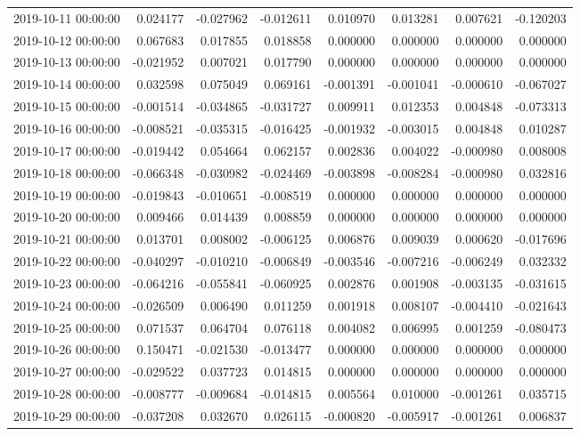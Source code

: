 \begin{tabular}{lrrrrrrr}
2019-10-11 00:00:00 & 0.024177 & -0.027962 & -0.012611 & 0.010970 & 0.013281 & 0.007621 & -0.120203 \\
2019-10-12 00:00:00 & 0.067683 & 0.017855 & 0.018858 & 0.000000 & 0.000000 & 0.000000 & 0.000000 \\
2019-10-13 00:00:00 & -0.021952 & 0.007021 & 0.017790 & 0.000000 & 0.000000 & 0.000000 & 0.000000 \\
2019-10-14 00:00:00 & 0.032598 & 0.075049 & 0.069161 & -0.001391 & -0.001041 & -0.000610 & -0.067027 \\
2019-10-15 00:00:00 & -0.001514 & -0.034865 & -0.031727 & 0.009911 & 0.012353 & 0.004848 & -0.073313 \\
2019-10-16 00:00:00 & -0.008521 & -0.035315 & -0.016425 & -0.001932 & -0.003015 & 0.004848 & 0.010287 \\
2019-10-17 00:00:00 & -0.019442 & 0.054664 & 0.062157 & 0.002836 & 0.004022 & -0.000980 & 0.008008 \\
2019-10-18 00:00:00 & -0.066348 & -0.030982 & -0.024469 & -0.003898 & -0.008284 & -0.000980 & 0.032816 \\
2019-10-19 00:00:00 & -0.019843 & -0.010651 & -0.008519 & 0.000000 & 0.000000 & 0.000000 & 0.000000 \\
2019-10-20 00:00:00 & 0.009466 & 0.014439 & 0.008859 & 0.000000 & 0.000000 & 0.000000 & 0.000000 \\
2019-10-21 00:00:00 & 0.013701 & 0.008002 & -0.006125 & 0.006876 & 0.009039 & 0.000620 & -0.017696 \\
2019-10-22 00:00:00 & -0.040297 & -0.010210 & -0.006849 & -0.003546 & -0.007216 & -0.006249 & 0.032332 \\
2019-10-23 00:00:00 & -0.064216 & -0.055841 & -0.060925 & 0.002876 & 0.001908 & -0.003135 & -0.031615 \\
2019-10-24 00:00:00 & -0.026509 & 0.006490 & 0.011259 & 0.001918 & 0.008107 & -0.004410 & -0.021643 \\
2019-10-25 00:00:00 & 0.071537 & 0.064704 & 0.076118 & 0.004082 & 0.006995 & 0.001259 & -0.080473 \\
2019-10-26 00:00:00 & 0.150471 & -0.021530 & -0.013477 & 0.000000 & 0.000000 & 0.000000 & 0.000000 \\
2019-10-27 00:00:00 & -0.029522 & 0.037723 & 0.014815 & 0.000000 & 0.000000 & 0.000000 & 0.000000 \\
2019-10-28 00:00:00 & -0.008777 & -0.009684 & -0.014815 & 0.005564 & 0.010000 & -0.001261 & 0.035715 \\
2019-10-29 00:00:00 & -0.037208 & 0.032670 & 0.026115 & -0.000820 & -0.005917 & -0.001261 & 0.006837 \\

\end{tabular}
